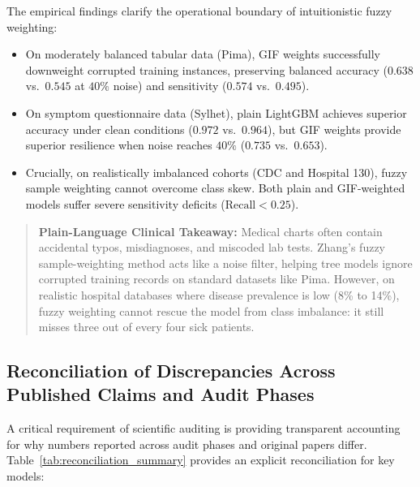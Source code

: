 \documentclass[journal,twocolumn]{IEEEtran}
\begin{document}
The empirical findings clarify the operational boundary of intuitionistic fuzzy weighting:
\begin{itemize}
    \item On moderately balanced tabular data (Pima), GIF weights successfully downweight corrupted training instances, preserving balanced accuracy ($0.638$ vs.\ $0.545$ at $40\%$ noise) and sensitivity ($0.574$ vs.\ $0.495$).
    \item On symptom questionnaire data (Sylhet), plain LightGBM achieves superior accuracy under clean conditions ($0.972$ vs.\ $0.964$), but GIF weights provide superior resilience when noise reaches $40\%$ ($0.735$ vs.\ $0.653$).
    \item Crucially, on realistically imbalanced cohorts (CDC and Hospital 130), fuzzy sample weighting cannot overcome class skew. Both plain and GIF-weighted models suffer severe sensitivity deficits ($\text{Recall} < 0.25$).
\end{itemize}

\begin{quote}
\small
\textbf{Plain-Language Clinical Takeaway:} Medical charts often contain accidental typos, misdiagnoses, and miscoded lab tests. Zhang's fuzzy sample-weighting method acts like a noise filter, helping tree models ignore corrupted training records on standard datasets like Pima. However, on realistic hospital databases where disease prevalence is low (8\% to 14\%), fuzzy weighting cannot rescue the model from class imbalance: it still misses three out of every four sick patients.
\end{quote}

\subsection{Reconciliation of Discrepancies Across Published Claims and Audit Phases}
\label{sec:reconciliation}
A critical requirement of scientific auditing is providing transparent accounting for why numbers reported across audit phases and original papers differ. Table~\ref{tab:reconciliation_summary} provides an explicit reconciliation for key models:
\end{document}
